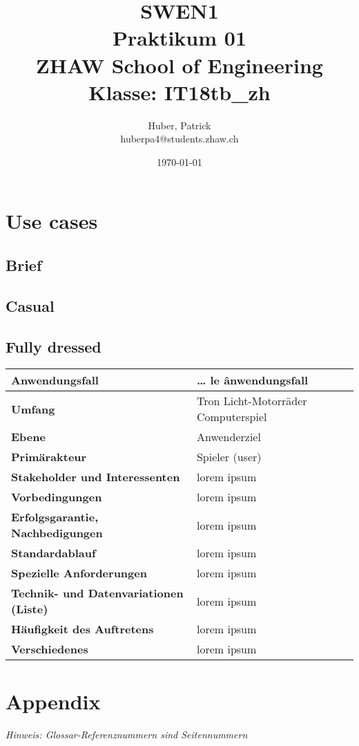 \documentclass[11pt,ngerman]{article}
\begin{document}
    \title{SWEN1\\Praktikum 01\\
        \vspace{1cm}
        \small{ZHAW  School of Engineering\\Klasse: IT18tb\_zh}
        \vspace{1.5cm}
    }
    \author{
        Huber, Patrick\\
        \small{huberpa4@students.zhaw.ch}
        \vspace{1.5cm}
    }
   \date{\today}

    \maketitle
    \newpage

    \tableofcontents
    \newpage

    \section{Use cases}

    \subsection{Brief}

    \subsection{Casual}

    \subsection{Fully dressed}
    \begin{tabularx}{\textwidth}{|l|X|}
        \hline
        \textbf{Anwendungsfall} & … le ânwendungsfall \\ \hline
        \textbf{Umfang} & Tron Licht-Motorräder Computerspiel \\ \hline
        \textbf{Ebene} & Anwenderziel \\ \hline
        \textbf{Primärakteur} & Spieler (user) \\ \hline
        \textbf{Stakeholder und Interessenten} & lorem ipsum \\ \hline
        \textbf{Vorbedingungen} & lorem ipsum \\ \hline
        \textbf{Erfolgsgarantie, Nachbedigungen} & lorem ipsum \\ \hline
        \textbf{Standardablauf} & lorem ipsum \\ \hline
        \textbf{Spezielle Anforderungen} & lorem ipsum \\ \hline
        \textbf{Technik- und Datenvariationen (Liste)} & lorem ipsum \\ \hline
        \textbf{Häufigkeit des Auftretens} & lorem ipsum \\ \hline
        \textbf{Verschiedenes} & lorem ipsum \\
        \hline
    \end{tabularx}


     \newpage

    \section{Appendix}
    \textit{Hinweis: Glossar-Referenznummern sind Seitennummern}
    \printglossary
\end{document}

